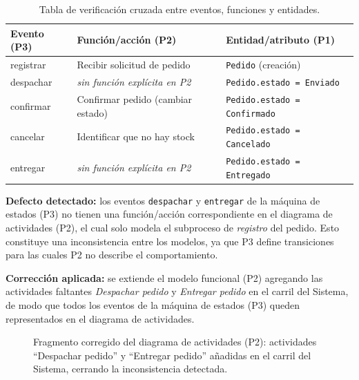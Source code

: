 \documentclass[11pt,a4paper]{article}
\begin{document}
\begin{table}[H]
\centering
\begin{tabular}{L{3cm} L{5.5cm} L{4.5cm}}
\toprule
\textbf{Evento (P3)} & \textbf{Función/acción (P2)} & \textbf{Entidad/atributo (P1)} \\
\midrule
registrar  & Recibir solicitud de pedido               & \texttt{Pedido} (creación) \\
despachar  & \emph{sin función explícita en P2}        & \texttt{Pedido.estado = Enviado} \\
confirmar  & Confirmar pedido (cambiar estado)         & \texttt{Pedido.estado = Confirmado} \\
cancelar   & Identificar que no hay stock              & \texttt{Pedido.estado = Cancelado} \\
entregar   & \emph{sin función explícita en P2}         & \texttt{Pedido.estado = Entregado} \\
\bottomrule
\end{tabular}
\caption{Tabla de verificación cruzada entre eventos, funciones y entidades.}
\end{table}

\textbf{Defecto detectado:} los eventos \texttt{despachar} y \texttt{entregar} de la máquina de
estados (P3) no tienen una función/acción correspondiente en el diagrama de actividades (P2), el
cual solo modela el subproceso de \emph{registro} del pedido. Esto constituye una inconsistencia
entre los modelos, ya que P3 define transiciones para las cuales P2 no describe el comportamiento.

\textbf{Corrección aplicada:} se extiende el modelo funcional (P2) agregando las actividades
faltantes \emph{Despachar pedido} y \emph{Entregar pedido} en el carril del Sistema, de modo que
todos los eventos de la máquina de estados (P3) queden representados en el diagrama de actividades.

\begin{figure}[H]
    \centering
    \caption{Fragmento corregido del diagrama de actividades (P2): actividades ``Despachar pedido'' y ``Entregar pedido'' añadidas en el carril del Sistema, cerrando la inconsistencia detectada.}
    \label{fig:p4-correccion}
\end{figure}
\end{document}
